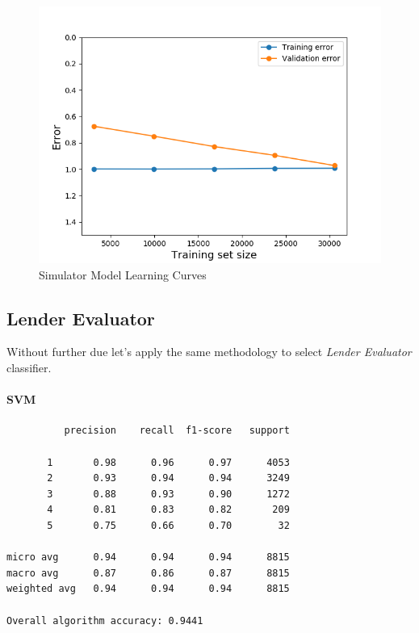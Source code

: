 \begin{Schunk}
\begin{figure}[H]

{\centering \includegraphics[width=1\linewidth]{../../models/training/simulator_rf_tuned_large_curves} 

}

\caption[Simulator Model Learning Curves]{Simulator Model Learning Curves}\label{fig:simulator_lc}
\end{figure}
\end{Schunk}

\hypertarget{lender-evaluator}{%
\subsection{Lender Evaluator}\label{lender-evaluator}}

Without further due let's apply the same methodology to select
\emph{Lender Evaluator} classifier.

\hypertarget{svm-1}{%
\paragraph{SVM}\label{svm-1}}

\begin{verbatim}
          precision    recall  f1-score   support

       1       0.98      0.96      0.97      4053
       2       0.93      0.94      0.94      3249
       3       0.88      0.93      0.90      1272
       4       0.81      0.83      0.82       209
       5       0.75      0.66      0.70        32

micro avg      0.94      0.94      0.94      8815
macro avg      0.87      0.86      0.87      8815
weighted avg   0.94      0.94      0.94      8815

Overall algorithm accuracy: 0.9441
\end{verbatim}

